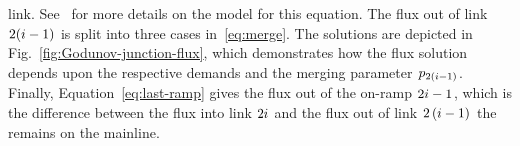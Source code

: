 			link. See~\cite{Monache2013} for more details on the model for this
			equation. The flux out of link $2(i-1)$ is split into three cases
			in~\eqref{eq:merge}. The solutions are depicted in Fig.~\ref{fig:Godunov-junction-flux},
			which demonstrates how the flux solution depends upon the respective
			demands and the merging parameter $p_{2\left(i-1\right)}$. Finally,
			Equation~\eqref{eq:last-ramp} gives the flux out of the on-ramp $2i-1$,
			which is the difference between the flux into link $2i$ and the
			flux out of link $2\left(i-1\right)$ the remains on the mainline.
			\begin{figure}
				\hfill{}\hfill{}
																

\end{figure}
